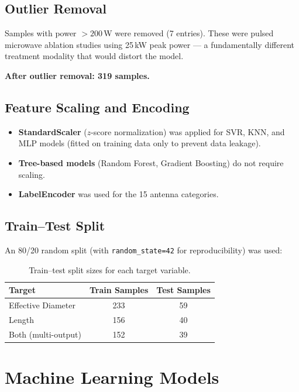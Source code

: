 \subsection{Outlier Removal}

Samples with power $>200$\,W were removed (7 entries). These were pulsed microwave ablation studies using 25\,kW peak power --- a fundamentally different treatment modality that would distort the model.

\noindent\textbf{After outlier removal: 319 samples.}


\subsection{Feature Scaling and Encoding}

\begin{itemize}
    \item \textbf{StandardScaler} ($z$-score normalization) was applied for SVR, KNN, and MLP models (fitted on training data only to prevent data leakage).
    \item \textbf{Tree-based models} (Random Forest, Gradient Boosting) do not require scaling.
    \item \textbf{LabelEncoder} was used for the 15 antenna categories.
\end{itemize}


\subsection{Train--Test Split}

An 80/20 random split (with \texttt{random\_state=42} for reproducibility) was used:

\begin{table}[H]
\centering
\caption{Train--test split sizes for each target variable.}
\label{tab:split}
\begin{tabular}{lcc}
\toprule
\textbf{Target} & \textbf{Train Samples} & \textbf{Test Samples} \\
\midrule
Effective Diameter & 233 & 59 \\
Length             & 156 & 40 \\
Both (multi-output)& 152 & 39 \\
\bottomrule
\end{tabular}
\end{table}


\section{Machine Learning Models}

